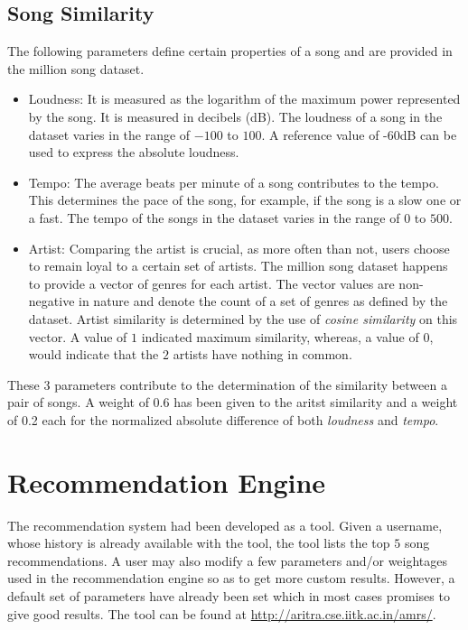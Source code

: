 		\subsection{Song Similarity}
		\label{subsec:song_similarity}
			The following parameters define certain properties of a song and are provided in the million song dataset.
\begin{itemize}
	\item Loudness: It is measured as the logarithm of the maximum power represented by the song. It is measured in decibels (dB). The loudness of a song in the dataset varies in the range of \(-100\) to \(100\). A reference value of -60dB can be used to express the absolute loudness.
	\item Tempo: The average beats per minute of a song contributes to the tempo. This determines the pace of the song, for example, if the song is a slow one or a fast. The tempo of the songs in the dataset varies in the range of \(0\) to \(500\).
	\item Artist: Comparing the artist is crucial, as more often than not, users choose to remain loyal to a certain set of artists. The million song dataset happens to provide a vector of genres for each artist. The vector values are non-negative in nature and denote the count of a set of genres as defined by the dataset. Artist similarity is determined by the use of \emph{cosine similarity} on this vector. A value of \(1\) indicated maximum similarity, whereas, a value of 0, would indicate that the \(2\) artists have nothing in common.
\end{itemize}

			These \(3\) parameters contribute to the determination of the similarity between a pair of songs. A weight of 0.6 has been given to the aritst similarity and a weight of 0.2 each for the normalized absolute difference of both \emph{loudness} and \emph{tempo}.
	
	\section {Recommendation Engine}
		The recommendation system had been developed as a tool. Given a username, whose history is already available with the tool, the tool lists the top \(5\) song recommendations. A user may also modify a few parameters and/or weightages used in the recommendation engine so as to get more custom results. However, a default set of parameters have already been set which in most cases promises to give good results. The tool can be found at \url{http://aritra.cse.iitk.ac.in/amrs/}.
		
